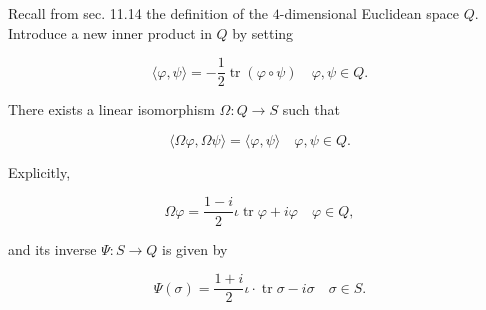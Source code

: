 Recall from sec. 11.14 the definition of the $4$-dimensional Euclidean space $Q$. Introduce a new inner product in $Q$ by setting

$$\langle \varphi, \psi \rangle = -\frac{1}{2} \operatorname{tr}(\varphi \circ \psi) \quad \varphi, \psi \in Q.$$

There exists a linear isomorphism $\Omega: Q \to S$ such that

$$\langle \Omega \varphi, \Omega \psi \rangle = \langle \varphi, \psi \rangle \quad \varphi, \psi \in Q.$$

Explicitly,

$$\Omega \varphi = \frac{1-i}{2} \iota \operatorname{tr} \varphi + i \varphi \quad \varphi \in Q,$$

and its inverse $\Psi: S \to Q$ is given by

$$\Psi(\sigma) = \frac{1+i}{2} \iota \cdot \operatorname{tr} \sigma - i \sigma \quad \sigma \in S.$$
